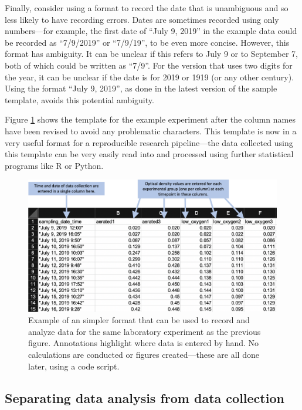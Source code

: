 \documentclass[]{tufte-book}
\begin{document}
Finally, consider using a format to record the date that is unambiguous and so
less likely to have recording errors. Dates are sometimes recorded using only
numbers---for example, the first date of ``July 9, 2019'' in the example data
could be recorded as ``7/9/2019'' or ``7/9/19'', to be even more concise. However,
this format has ambiguity. It can be unclear if this refers to July 9 or to
September 7, both of which could be written as ``7/9''. For the version that uses
two digits for the year, it can be unclear if the date is for 2019 or 1919 (or
any other century). Using the format ``July 9, 2019'', as done in the latest
version of the sample template, avoids this potential ambiguity.

Figure \ref{fig:growthsimple2} shows the template for the example experiment after the
column names have been revised to avoid any problematic characters. This template is now in
a very useful format for a reproducible research pipeline---the data collected using this
template can be very easily read into and processed using further statistical programs like
R or Python.

\begin{figure}
\includegraphics[width=\textwidth]{figures/growth_curve_simple} \caption[Example of an simpler format that can be used to record and analyze data for the same laboratory experiment as the previous figure]{Example of an simpler format that can be used to record and analyze data for the same laboratory experiment as the previous figure. Annotations highlight where data is entered by hand. No calculations are conducted or figures created---these are all done later, using a code script.}\label{fig:growthsimple2}
\end{figure}

\subsection{Separating data analysis from data collection}\label{separating-data-analysis-from-data-collection}
\end{document}
